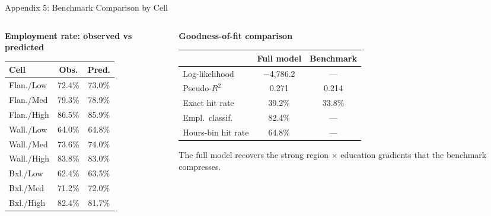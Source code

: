 \documentclass[aspectratio=169,11pt]{beamer}
\begin{document}
\begin{frame}{Appendix 5: Benchmark Comparison by Cell}

\begin{columns}[T]
\begin{column}{0.48\textwidth}
\centering
\footnotesize
\textbf{Employment rate: observed vs predicted}\\[4pt]
\begin{tabular}{@{}l cc@{}}
\toprule
\textbf{Cell} & \textbf{Obs.} & \textbf{Pred.} \\
\midrule
Flan./Low   & 72.4\% & 73.0\% \\
Flan./Med   & 79.3\% & 78.9\% \\
Flan./High  & 86.5\% & 85.9\% \\
Wall./Low   & 64.0\% & 64.8\% \\
Wall./Med   & 73.6\% & 74.0\% \\
Wall./High  & 83.8\% & 83.0\% \\
Bxl./Low    & 62.4\% & 63.5\% \\
Bxl./Med    & 71.2\% & 72.0\% \\
Bxl./High   & 82.4\% & 81.7\% \\
\bottomrule
\end{tabular}
\end{column}
\begin{column}{0.48\textwidth}
\centering
\footnotesize
\textbf{Goodness-of-fit comparison}\\[4pt]
\begin{tabular}{@{}l cc@{}}
\toprule
 & \textbf{Full model} & \textbf{Benchmark} \\
\midrule
Log-likelihood     & $-$4,786.2 & --- \\
Pseudo-$R^2$       & 0.271 & 0.214 \\
Exact hit rate     & 39.2\% & 33.8\% \\
Empl.\ classif.   & 82.4\% & --- \\
Hours-bin hit rate & 64.8\% & --- \\
\bottomrule
\end{tabular}

\bigskip
\scriptsize\textcolor{cgrey}{The full model recovers the strong region $\times$ education gradients that the benchmark compresses.}
\end{column}
\end{columns}
\end{frame}
\end{document}
